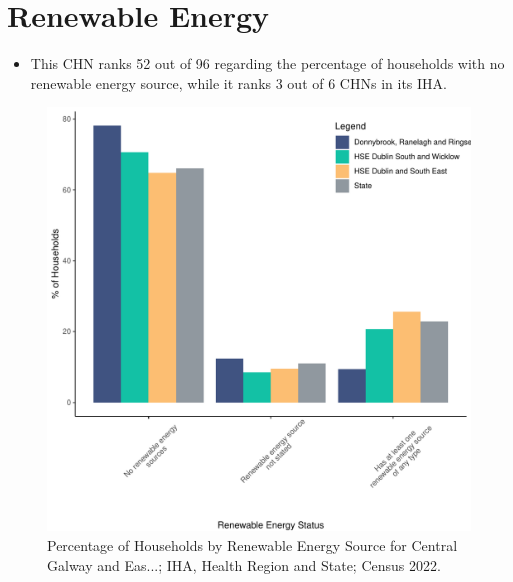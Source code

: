 \documentclass{article}
\begin{document}
\section{Renewable Energy}\label{sect:RE}
\begin{itemize}
\item This CHN ranks  52 out of 96 regarding the percentage of households with no renewable energy source, while it ranks   3 out of 6 CHNs in its IHA.
\end{itemize}
\begin{figure}[H]
	\centering
	\includegraphics[width = 140mm]{../figures/RenewableEnergyED.pdf}
	\caption{Percentage of Households by Renewable Energy Source for Central Galway and Eas...; IHA, Health Region and State; Census 2022.}
	\label{fig:vbnv}
	\end{figure}
\end{document}
